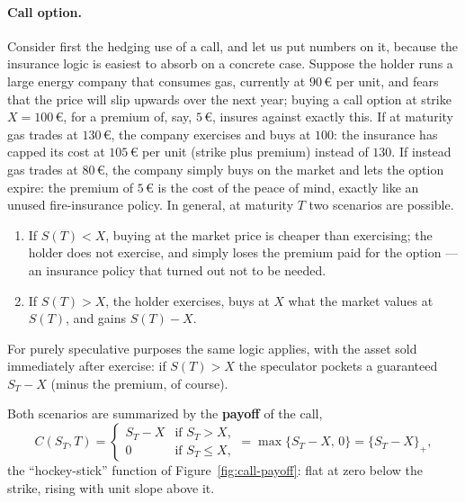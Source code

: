 \paragraph*{Call option.}

Consider first the hedging use of a call, and let us put numbers on it, because the insurance logic is easiest to absorb on a concrete case.
Suppose the holder runs a large energy company that consumes gas, currently at $90$\,\euro{} per unit, and fears that the price will slip upwards over the next year; buying a call option at strike $X = 100$\,\euro{}, for a premium of, say, $5$\,\euro{}, insures against exactly this.
If at maturity gas trades at $130$\,\euro{}, the company exercises and buys at $100$: the insurance has capped its cost at $105$\,\euro{} per unit (strike plus premium) instead of $130$.
If instead gas trades at $80$\,\euro{}, the company simply buys on the market and lets the option expire: the premium of $5$\,\euro{} is the cost of the peace of mind, exactly like an unused fire-insurance policy.
In general, at maturity $T$ two scenarios are possible.
\begin{enumerate}[label=\alph*)]
    \item If $S(T) < X$, buying at the market price is cheaper than exercising; the holder does not exercise, and simply loses the premium paid for the option --- an insurance policy that turned out not to be needed.
    \item If $S(T) > X$, the holder exercises, buys at $X$ what the market values at $S(T)$, and gains $S(T)-X$.
\end{enumerate}
For purely speculative purposes the same logic applies, with the asset sold immediately after exercise: if $S(T)>X$ the speculator pockets a guaranteed $S_T - X$ (minus the premium, of course).

Both scenarios are summarized by the \textbf{payoff} of the call,
\begin{equation}\label{eq:call-payoff}
C(S_T, T) = \begin{cases} S_T - X & \text{if } S_T > X, \\ 0 & \text{if } S_T \le X, \end{cases} = \max\{S_T - X,\, 0\} = \{S_T - X\}_+,
\end{equation}
the ``hockey-stick'' function of Figure~\ref{fig:call-payoff}: flat at zero below the strike, rising with unit slope above it.

